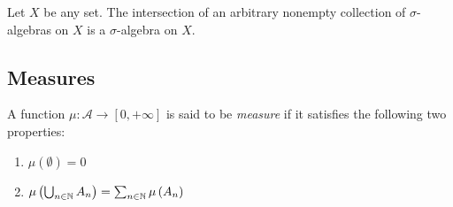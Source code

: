 \begin{proposition}
Let $X$ be any set. The intersection of an arbitrary nonempty collection of $\sigma$-algebras on $X$ is a $\sigma$-algebra on $X$.
\end{proposition}


\subsection{Measures}
\begin{definition}
    A function $\mu : \mathscr A \to [0,+\infty]$ is said to be \textit{measure} if it satisfies the following two properties:
    \begin{enumerate}
	\item $\mu (\emptyset) = 0$
	\item $\mu \left( \bigcup_{n\in\mathbb N} A_n  \right) = \sum_{n\in\mathbb N} \mu \left( A_n  \right)$
    \end{enumerate}
\end{definition}
